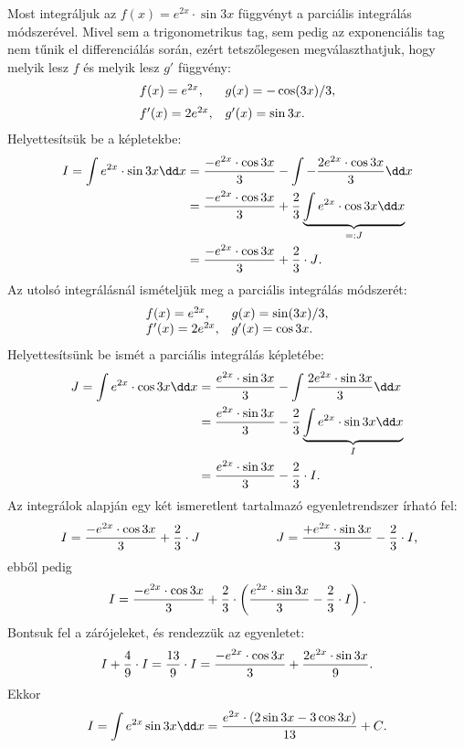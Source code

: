 \begin{example}
  Most integráljuk az $f(x) = e^{2x} \cdot \sin 3x$ függvényt a parciális
  integrálás módszerével. Mivel sem a trigonometrikus tag, sem pedig az
  exponenciális tag nem tűnik el differenciálás során, ezért tetszőlegesen
  megválaszthatjuk, hogy melyik lesz $f$ és melyik lesz $g'$ függvény:
  \[
    \begin{array}{ll}
      f(x) = e^{2x}          \text, &
      g(x) = - \cos (3x) / 3 \text,   \\[2mm]
      f'(x) = 2 e^{2x}       \text, &
      g'(x) = \sin 3x        \text.   \\
    \end{array}
  \]
  Helyettesítsük be a képletekbe:
  \begin{align*}
    I = \int e^{2x} \cdot \sin 3x \dd x
     & = \frac{-e^{2x} \cdot \cos 3x}{3}
    - \int - \frac{2 e^{2x} \cdot \cos 3x}{3} \dd x
    \\
     & = \frac{-e^{2x} \cdot \cos 3x}{3}
    + \frac{2}{3} \underbrace{\int e^{2x} \cdot \cos 3x \dd x}_{=:J}
    \\
     & = \frac{-e^{2x} \cdot \cos 3x}{3}
    + \frac{2}{3} \cdot J
    \text.
  \end{align*}
  Az utolsó integrálásnál ismételjük meg a parciális integrálás módszerét:
  \[
    \begin{array}{ll}
      f(x) = e^{2x}        \text, &
      g(x) = \sin (3x) / 3 \text,   \\
      f'(x) = 2 e^{2x}     \text, &
      g'(x) = \cos 3x      \text.   \\
    \end{array}
  \]
  Helyettesítsünk be ismét a parciális integrálás képletébe:
  \begin{align*}
    J = \int e^{2x} \cdot \cos 3x \dd x
     & = \frac{e^{2x} \cdot \sin 3x}{3}
    - \int \frac{2 e^{2x} \cdot \sin 3x}{3} \dd x
    \\
     & = \frac{e^{2x} \cdot \sin 3x}{3}
    - \frac{2}{3} \underbrace{\int e^{2x} \cdot \sin 3x \dd x}_{I}
    \\
     & = \frac{e^{2x} \cdot \sin 3x}{3}
    - \frac{2}{3} \cdot I
    \text.
  \end{align*}
  Az integrálok alapján egy két ismeretlent tartalmazó egyenletrendszer írható
  fel:
  \[
    \; I = \dfrac{-e^{2x} \cdot \cos 3x}{3}
    + \dfrac{2}{3} \cdot J
    \hspace{2cm}
    \; J = \dfrac{+e^{2x} \cdot \sin 3x}{3}
    - \dfrac{2}{3} \cdot I
    \text,
  \]
  ebből pedig
  \[
    I = \frac{-e^{2x} \cdot \cos 3x}{3}
    + \frac{2}{3} \cdot \left( \frac{e^{2x} \cdot \sin 3x}{3}
    - \frac{2}{3} \cdot I \right)
    \text.
  \]
  Bontsuk fel a zárójeleket, és rendezzük az egyenletet:
  \[
    I + \frac{4}{9} \cdot I
    = \frac{13}{9} \cdot I
    = \frac{-e^{2x} \cdot \cos 3x}{3}
    + \frac{2 e^{2x} \cdot \sin 3x}{9}
    \text.
  \]
  Ekkor
  \[
    I = \int e^{2x} \sin 3x \dd x
    = \frac{e^{2x} \cdot (2 \sin 3x - 3 \cos 3x)}{13}
    + C
    \text.
  \]
\end{example}

